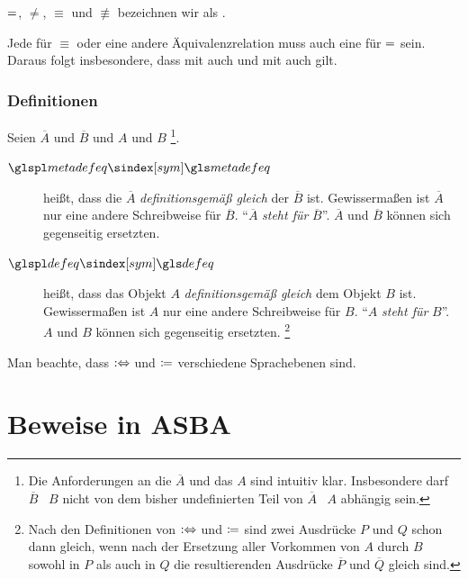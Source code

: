 $=$, $\ne$, $\equiv$ und $\nequiv$ bezeichnen wir als  \emph{}.

Jede  für $\equiv$ oder eine andere Äquivalenzrelation muss auch eine für $=$ sein.
Daraus folgt insbesondere, dass mit  auch  und mit  auch  gilt.

\subsubsection{Definitionen}%
\label{subsub:Definitionen}

{
	\newcommand*{\A}{\overline{A}}
	\newcommand*{\B}{\overline{B}}
	Seien $\A$ und $\B$  und $A$ und $B$ %
	\footnote{%
		Die Anforderungen an die  $\A$ und das  $A$ sind intuitiv klar.
		Insbesondere darf $\B$ \textbzw\ $B$ nicht von dem bisher undefinierten Teil von $\A$ \textbzw\ $A$ abhängig sein.
	}.
	\begin{description}
		\item[$\glsSym{metadefeq}$~\emph{}]\label{def:Metadefinition}
		\seqqt{$\A \metadefeq \B$} heißt, dass die  $\A$ \emph{definitionsgemäß gleich} der  $\B$ ist.
		Gewissermaßen ist $\A$ nur eine andere Schreibweise für $\B$.
		\enquote{$\A$ \emph{steht für} $\B$}.
		$\A$ und $\B$ können sich gegenseitig ersetzten.
		\item[$\glsSym{defeq}$~\emph{}]\label{def:Definition}
		 heißt, dass das Objekt $A$ \emph{definitionsgemäß gleich} dem Objekt $B$ ist.
		Gewissermaßen ist $A$ nur eine andere Schreibweise für $B$.
		\enquote{$A$ \emph{steht für} $B$}.
		$A$ und $B$ können sich gegenseitig ersetzten.%
		\footnote{%
			Nach den Definitionen von $:\Leftrightarrow$ und $\coloneqq$ sind zwei Ausdrücke $P$ und $Q$ schon dann gleich, wenn nach der Ersetzung aller Vorkommen von $A$ durch $B$ sowohl in $P$ als auch in $Q$ die resultierenden Ausdrücke $\overline{P}$ und $\overline{Q}$ gleich sind.
		}

	\end{description}
	Man beachte, dass $:\Leftrightarrow$ und $\coloneqq$ verschiedene Sprachebenen sind.
}

\section{Beweise in ASBA}%
\label{sec:BeweiseASBA}

